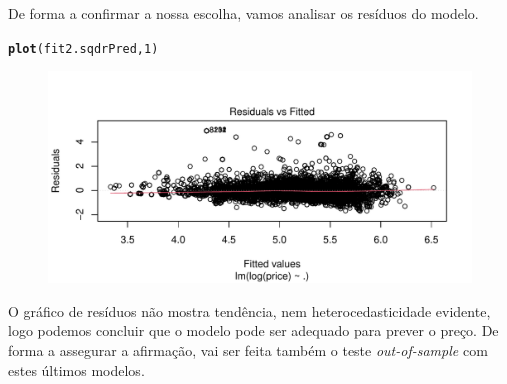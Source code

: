 \documentclass[justified, 11pt]{scrartcl}\usepackage[]{graphicx}\usepackage[]{xcolor}
\makeatletter
\def\maxwidth{ %
  \ifdim\Gin@nat@width>\linewidth
    \linewidth
  \else
    \Gin@nat@width
  \fi
}
\newcommand{\hlnum}[1]{\textcolor[rgb]{0.686,0.059,0.569}{#1}}%
\newcommand{\hlstd}[1]{\textcolor[rgb]{0.345,0.345,0.345}{#1}}%
\newcommand{\hlkwd}[1]{\textcolor[rgb]{0.737,0.353,0.396}{\textbf{#1}}}%
\newenvironment{kframe}{%
 \def\at@end@of@kframe{}%
 \ifinner\ifhmode%
  \def\at@end@of@kframe{\end{minipage}}%
  \begin{minipage}{\columnwidth}%
 \fi\fi%
 \def\FrameCommand##1{\hskip\@totalleftmargin \hskip-\fboxsep
 \colorbox{shadecolor}{##1}\hskip-\fboxsep
     \hskip-\linewidth \hskip-\@totalleftmargin \hskip\columnwidth}%
 \MakeFramed {\advance\hsize-\width
   \@totalleftmargin\z@ \linewidth\hsize
   \@setminipage}}%
 {\par\unskip\endMakeFramed%
 \at@end@of@kframe}
\newenvironment{knitrout}{}{} %
\makeatother
\begin{document}
De forma a confirmar a nossa escolha, vamos analisar os resíduos do modelo.\\
\begin{knitrout}
\color{fgcolor}\begin{kframe}
\begin{alltt}
\hlkwd{plot}\hlstd{(fit2.sqdrPred,} \hlnum{1}\hlstd{)}
\end{alltt}
\end{kframe}\begin{figure}
\includegraphics[width=\maxwidth]{figure/chunk-residPlot-1} \end{figure}

\end{knitrout}
O gráfico de resíduos não mostra tendência, nem heterocedasticidade evidente, logo podemos concluir que o modelo pode ser adequado para prever o preço. De forma a assegurar a afirmação, vai ser feita também o teste \textit{out-of-sample} com estes últimos modelos.
\end{document}
